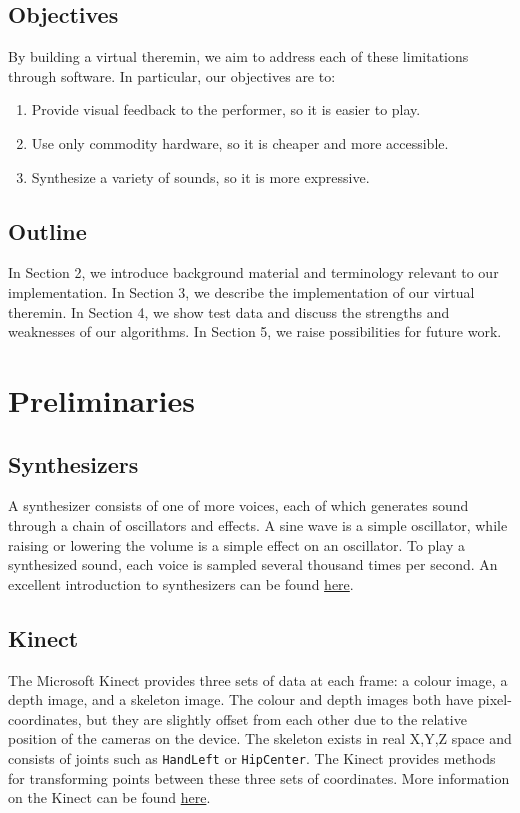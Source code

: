 \documentclass[12pt]{article}
\begin{document}
\subsection{Objectives}
By building a virtual theremin, we aim to address each of these limitations through software.  In particular, our objectives are to:

\begin{enumerate}
\item Provide visual feedback to the performer, so it is easier to play.
\item Use only commodity hardware, so it is cheaper and more accessible.
\item Synthesize a variety of sounds, so it is more expressive.
\end{enumerate}

\subsection{Outline}
In Section 2, we introduce background material and terminology relevant to our implementation.  In Section 3, we describe the implementation of our virtual theremin.  In Section 4, we show test data and discuss the strengths and weaknesses of our algorithms.  In Section 5, we raise possibilities for future work.



\section{Preliminaries}
\subsection{Synthesizers}
A synthesizer consists of one of more voices, each of which generates sound through a chain of oscillators and effects.  A sine wave is a simple oscillator, while raising or lowering the volume is a simple effect on an oscillator.  To play a synthesized sound, each voice is sampled several thousand times per second.  An excellent introduction to synthesizers can be found \href{http://www.codeproject.com/Articles/19618/C-Synth-Toolkit-Part-I}{here}.

\subsection{Kinect}
The Microsoft Kinect provides three sets of data at each frame: a colour image, a depth image, and a skeleton image.  The colour and depth images both have pixel-coordinates, but they are slightly offset from each other due to the relative position of the cameras on the device.  The skeleton exists in real X,Y,Z space and consists of joints such as \texttt{HandLeft} or \texttt{HipCenter}.  The Kinect provides methods for transforming points between these three sets of coordinates.  More information on the Kinect can be found \href{http://www.microsoft.com/en-us/kinectforwindows/develop/resources.aspx}{here}.
\end{document}
